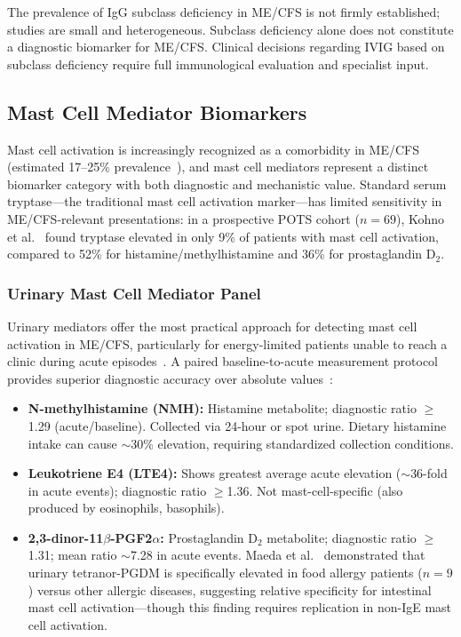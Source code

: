 \begin{limitation}
The prevalence of IgG subclass deficiency in ME/CFS is not firmly established; studies are small and heterogeneous. Subclass deficiency alone does not constitute a diagnostic biomarker for ME/CFS. Clinical decisions regarding IVIG based on subclass deficiency require full immunological evaluation and specialist input.
\end{limitation}

\subsection{Mast Cell Mediator Biomarkers}
\label{subsec:mast-cell-biomarkers}

Mast cell activation is increasingly recognized as a comorbidity in ME/CFS (estimated 17--25\% prevalence~\cite{Rohrhofer2025mecfsmast}), and mast cell mediators represent a distinct biomarker category with both diagnostic and mechanistic value. Standard serum tryptase---the traditional mast cell activation marker---has limited sensitivity in ME/CFS-relevant presentations: in a prospective POTS cohort ($n = 69$), Kohno et al.~\cite{Kohno2021potsmast} found tryptase elevated in only 9\% of patients with mast cell activation, compared to 52\% for histamine/methylhistamine and 36\% for prostaglandin D$_2$.

\subsubsection{Urinary Mast Cell Mediator Panel}

Urinary mediators offer the most practical approach for detecting mast cell activation in ME/CFS, particularly for energy-limited patients unable to reach a clinic during acute episodes~\cite{Voelker2024urinemast}. A paired baseline-to-acute measurement protocol provides superior diagnostic accuracy over absolute values~\cite{Voelker2025biomarkersmast}:

\begin{itemize}
    \item \textbf{N-methylhistamine (NMH):} Histamine metabolite; diagnostic ratio $\geq$1.29 (acute/baseline). Collected via 24-hour or spot urine. Dietary histamine intake can cause $\sim$30\% elevation, requiring standardized collection conditions.
    \item \textbf{Leukotriene E4 (LTE4):} Shows greatest average acute elevation ($\sim$36-fold in acute events); diagnostic ratio $\geq$1.36. Not mast-cell-specific (also produced by eosinophils, basophils).
    \item \textbf{2,3-dinor-11$\beta$-PGF2$\alpha$:} Prostaglandin D$_2$ metabolite; diagnostic ratio $\geq$1.31; mean ratio $\sim$7.28 in acute events. Maeda et al.~\cite{Maeda2017pgdm} demonstrated that urinary tetranor-PGDM is specifically elevated in food allergy patients ($n = 9$) versus other allergic diseases, suggesting relative specificity for intestinal mast cell activation---though this finding requires replication in non-IgE mast cell activation.
\end{itemize}

